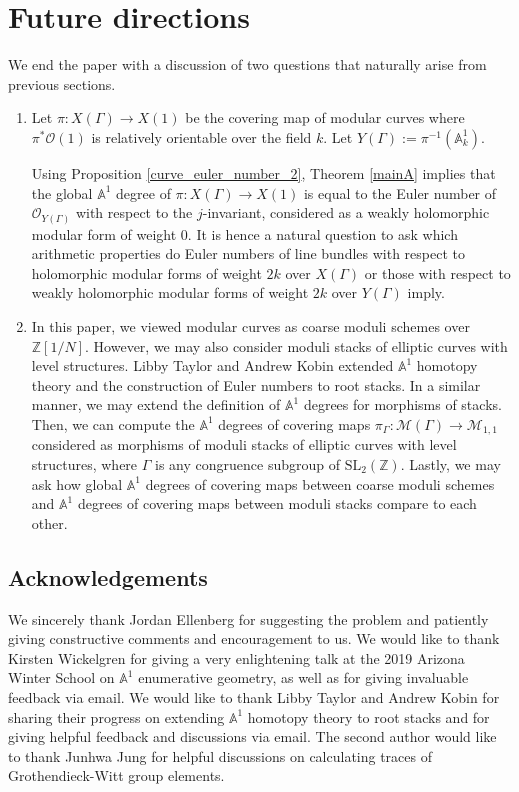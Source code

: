 \documentclass[12pt, reqno]{amsart}
\theoremstyle{definition}
\newcommand{\Z}{\mathbb{Z}}
\newcommand{\A}{\mathbb{A}} %
\newcommand{\Oh}{\mathscr{O}} %
\begin{document}
\section{Future directions}
We end the paper with a discussion of two questions that naturally arise from previous sections.
\begin{enumerate}
    \item Let $\pi: X(\Gamma) \to X(1)$ be the covering map of modular curves where $\pi^* \Oh(1)$ is relatively orientable over the field $k$. Let $Y(\Gamma) := \pi^{-1}(\A^1_k)$.
    
    Using Proposition \ref{curve_euler_number_2}, Theorem \ref{mainA} implies that the global $\A^1$ degree of $\pi: X(\Gamma) \to X(1)$ is equal to the Euler number of $\Oh_{Y(\Gamma)}$ with respect to the $j$-invariant, considered as a weakly holomorphic modular form of weight $0$. It is hence a natural question to ask which arithmetic properties do Euler numbers of line bundles with respect to holomorphic modular forms of weight $2k$ over $X(\Gamma)$ or those with respect to weakly holomorphic modular forms of weight $2k$ over $Y(\Gamma)$ imply.
    
    \item In this paper, we viewed modular curves as coarse moduli schemes over $\Z[1/N]$. However, we may also consider moduli stacks of elliptic curves with level structures. Libby Taylor and Andrew Kobin \cite{tkstack} extended $\A^1$ homotopy theory and the construction of Euler numbers to root stacks. In a similar manner, we may extend the definition of $\A^1$ degrees for morphisms of stacks. Then, we can compute the $\A^1$ degrees of covering maps $\pi_\Gamma: \mathcal{M}(\Gamma) \to \mathcal{M}_{1,1}$ considered as morphisms of moduli stacks of elliptic curves with level structures, where $\Gamma$ is any congruence subgroup of $\textrm{SL}_2(\Z)$. Lastly, we may ask how global $\A^1$ degrees of covering maps between coarse moduli schemes and $\A^1$ degrees of covering maps between moduli stacks compare to each other.
\end{enumerate}

\subsection*{Acknowledgements}

We sincerely thank Jordan Ellenberg for suggesting the problem and patiently giving constructive comments and encouragement to us. We would like to thank Kirsten Wickelgren for giving a very enlightening talk at the 2019 Arizona Winter School on $\A^1$ enumerative geometry, as well as for giving invaluable feedback via email. We would like to thank Libby Taylor and Andrew Kobin for sharing their progress on extending $\A^1$ homotopy theory to root stacks and for giving helpful feedback and discussions via email. The second author would like to thank Junhwa Jung for helpful discussions on calculating traces of Grothendieck-Witt group elements.
\end{document}
